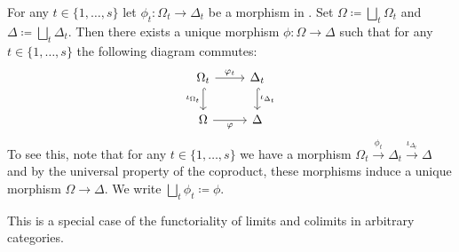 \begin{rem}
For any $t \in \{1,\dots,s\}$ let $\phi_t\colon \Omega_t \to \Delta_t$ be a morphism in \SkeletalGSets{}. Set $\Omega \coloneqq \bigsqcup_t \Omega_t$ and $\Delta \coloneqq \bigsqcup_t \Delta_t$. Then there exists a unique morphism $\phi\colon \Omega \to \Delta$ such that for any $t \in \{1,\dots,s\}$ the following diagram commutes:
\[
\begin{tikzcd}
\Omega_t \arrow[d, "\iota_{\Omega_t}"', hook] \arrow[r, "\phi_t"] & \Delta_t \arrow[d, "\iota_{\Delta_t}", hook] \\
\Omega \arrow[r, "\phi"']                                         & \Delta                                      
\end{tikzcd}
\]
To see this, note that for any $t \in \{1,\dots,s\}$ we have a morphism $\Omega_t \stackrel{\phi_t}{\longrightarrow} \Delta_t \stackrel{\iota_{\Delta_t}}{\longrightarrow} \Delta$ and by the universal property of the coproduct, these morphisms induce a unique morphism $\Omega \to \Delta$. We write $\bigsqcup_t \phi_t \coloneqq \phi$.

This is a special case of the functoriality of limits and colimits in arbitrary categories.
\end{rem}

